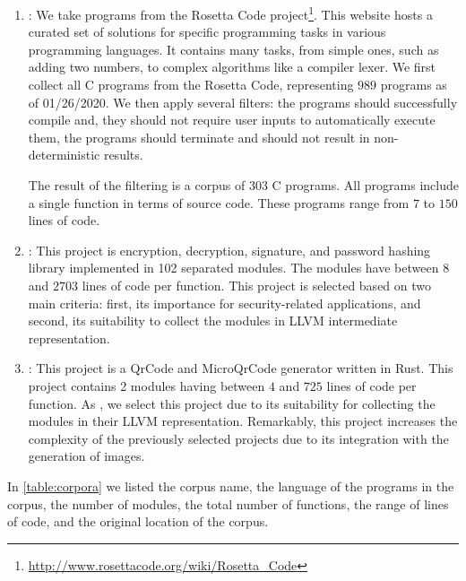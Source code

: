 \begin{enumerate}
    \item \textbf{\corpusrosetta}: We take programs from the  Rosetta Code project\footnote{\url{http://www.rosettacode.org/wiki/Rosetta_Code}}. This website hosts a curated set of solutions for specific programming tasks in various programming languages. It contains many tasks, from simple ones, such as adding two numbers, to complex algorithms like a compiler lexer. We first collect all C programs from the Rosetta Code, representing $989$ programs as of 01/26/2020. We then apply several filters: the programs should successfully compile and, they should not require user inputs to automatically execute them, the programs should terminate and should not result in non-deterministic results. 
    
    The result of the filtering is a corpus of 303 C programs. All programs include a single function in terms of source code. These programs range from $7$ to $150$ lines of code.

    \item \textbf{\corpussodium}: This project is encryption, decryption, signature, and password hashing library implemented in 102 separated modules. The modules have between $8$ and $2703$ lines of code per function. This project is selected based on two main criteria: first, its importance for security-related applications, and second, its suitability to collect the modules in LLVM intermediate representation. %

    \item \textbf{\corpusqrcode}: This project is a QrCode and MicroQrCode generator written in Rust. This project contains 2 modules having between $4$ and $725$ lines of code per function. As \corpussodium, we select this project due to its suitability for collecting the modules in their LLVM representation. Remarkably, this project increases the complexity of the previously selected projects due to its integration with the generation of images.
    
\end{enumerate}

In \autoref{table:corpora} we listed the corpus name, the language of the programs in the corpus, the number of modules, the total number of functions, the range of lines of code, and the original location of the corpus. 



